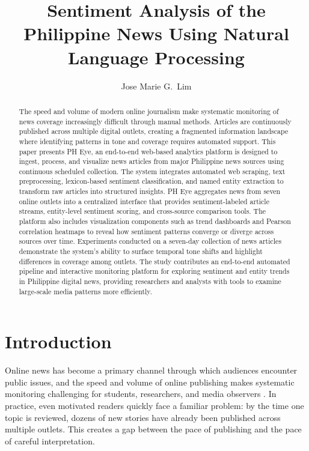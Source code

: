 \documentclass[sigconf, nonacm]{acmart}
\begin{document}
\title[]{Sentiment Analysis of the Philippine News Using Natural Language Processing}

\author{Jose Marie G.\ Lim}

\begin{abstract}
The speed and volume of modern online journalism make systematic monitoring of news coverage increasingly difficult through manual methods. Articles are continuously published across multiple digital outlets, creating a fragmented information landscape where identifying patterns in tone and coverage requires automated support. This paper presents PH Eye, an end-to-end web-based analytics platform is designed to ingest, process, and visualize news articles from major Philippine news sources using continuous scheduled collection. The system integrates automated web scraping, text preprocessing, lexicon-based sentiment classification, and named entity extraction to transform raw articles into structured insights. PH Eye aggregates news from seven online outlets into a centralized interface that provides sentiment-labeled article streams, entity-level sentiment scoring, and cross-source comparison tools. The platform also includes visualization components such as trend dashboards and Pearson correlation heatmaps to reveal how sentiment patterns converge or diverge across sources over time. Experiments conducted on a seven-day collection of news articles demonstrate the system’s ability to surface temporal tone shifts and highlight differences in coverage among outlets. The study contributes an end-to-end automated pipeline and interactive monitoring platform for exploring sentiment and entity trends in Philippine digital news, providing researchers and analysts with tools to examine large-scale media patterns more efficiently.
\end{abstract}


\maketitle

\section{Introduction}
Online news has become a primary channel through which audiences encounter public issues, and the speed and volume of online publishing makes systematic monitoring challenging for students, researchers, and media observers \cite{datareportal}. In practice, even motivated readers quickly face a familiar problem: by the time one topic is reviewed, dozens of new stories have already been published across multiple outlets. This creates a gap between the pace of publishing and the pace of careful interpretation.
\end{document}
